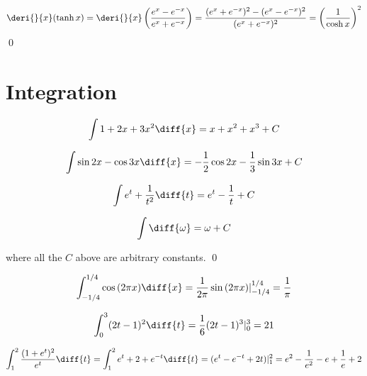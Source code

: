 \documentclass[12pt]{article}
\begin{document}
\begin{equation}
    \deri{}{x} (\tanh{x}) = \deri{}{x} \left( \frac{e^{x} - e^{-x}}{e^{x} + e^{-x}} \right) = \frac{(e^{x} + e^{-x})^{2} - (e^{x} - e^{-x})^{2}}{(e^{x} + e^{-x})^{2}} = \left( \frac{1}{\cosh{x}} \right)^{2}
\end{equation}
\qed


\pagebreak
\section*{Integration}



\begin{equation}
    \int 1 + 2x + 3x^{2} \diff{x} = x + x^{2} + x^{3} + C
\end{equation}

\begin{equation}
    \int \sin{2x} - \cos{3x} \diff{x} = - \frac{1}{2} \cos{2x} - \frac{1}{3} \sin{3x} + C
\end{equation}

\begin{equation}
    \int e^{t} + \frac{1}{t^{2}} \diff{t} = e^{t} - \frac{1}{t} + C
\end{equation}

\begin{equation}
    \int  \diff{\omega} = \omega + C
\end{equation}

where all the $C$ above are arbitrary constants.
\qed



\begin{equation}
    \int_{-1/4}^{1/4} \cos{(2\pi x)} \diff{x} = \frac{1}{2\pi} \sin{(2\pi x)} \rvert_{-1/4}^{1/4} = \frac{1}{\pi}
\end{equation}

\begin{equation}
    \int_{0}^{3} (2t - 1)^{2} \diff{t} = \frac{1}{6} (2t - 1)^{3} \rvert_{0}^{3} = 21
\end{equation}

\begin{equation}
    \int_{1}^{2} \frac{(1 + e^{t})^{2}}{e^{t}} \diff{t} = \int_{1}^{2} e^{t} + 2 + e^{-t} \diff{t} = (e^{t} - e^{-t} + 2t) \rvert_{1}^{2} = e^{2}  - \frac{1}{e^{2}} - e + \frac{1}{e} + 2
\end{equation}
\end{document}
